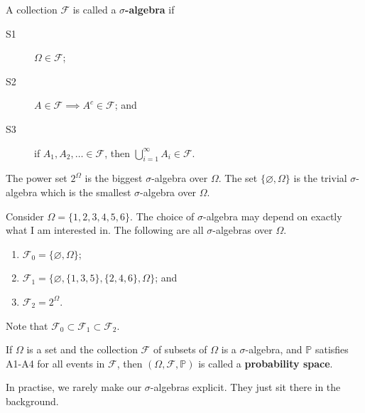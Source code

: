 \begin{definition}
    A collection $\mathcal F$ is called a \textbf{$\sigma$-algebra} if
    \begin{description}
        \item[S1] $\Omega \in \mathcal F$;
        \item[S2] $A \in \mathcal F \implies A^c \in \mathcal F$; and
        \item[S3] if $A_1, A_2, \ldots \in \mathcal F$, then $\bigcup_{i = 1}^\infty A_i \in \mathcal F$.  
    \end{description}
\end{definition}

\begin{example}
    The power set $2^\Omega$ is the biggest $\sigma$-algebra over $\Omega$. The set $\{ \varnothing, \Omega \}$ is the trivial $\sigma$-algebra which is the smallest $\sigma$-algebra over $\Omega$.
\end{example}

\begin{example}
    Consider $\Omega = \{ 1, 2, 3, 4, 5, 6 \}$. The choice of $\sigma$-algebra may depend on exactly what I am interested in. The following are all $\sigma$-algebras over $\Omega$.
    \begin{enumerate}
        \item $\mathcal F_0 = \{ \varnothing, \Omega \}$;
        \item $\mathcal F_1 = \{ \varnothing, \{ 1, 3, 5 \}, \{ 2, 4, 6 \}, \Omega \}$; and
        \item $\mathcal F_2 = 2^\Omega$.
    \end{enumerate}
    Note that $\mathcal F_0 \subset \mathcal F_1 \subset \mathcal F_2$.
\end{example}

\begin{definition}
    If $\Omega$ is a set and the collection $\mathcal F$ of subsets of $\Omega$ is a $\sigma$-algebra, and $\mathbb P$ satisfies A1-A4 for all events in $\mathcal F$, then $(\Omega, \mathcal F, \mathbb P)$ is called a \textbf{probability space}.
\end{definition}

In practise, we rarely make our $\sigma$-algebras explicit. They just sit there in the background.
